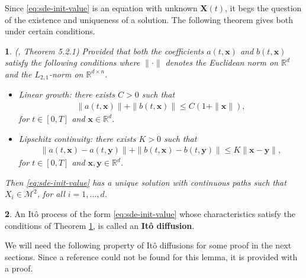 \documentclass[english]{article}
\numberwithin{equation}{section}
\numberwithin{figure}{section}
\theoremstyle{bolddescit}
\newtheorem{theorem}{\protect\theoremname}[section]
\theoremstyle{definition}
\newtheorem{definition}[theorem]{\protect\definitionname}
\theoremstyle{definition}
\theoremstyle{plain}
\theoremstyle{plain}
\theoremstyle{bolddesc}
\theoremstyle{plain}
\theoremstyle{remark}
\providecommand{\definitionname}{Definition}
\providecommand{\theoremname}{Theorem}
\begin{document}
Since \eqref{eq:sde-init-value} is an equation with unknown $\mathbf{X}(t)$, it begs the question of the existence and uniqueness of a solution. The following theorem gives both under certain conditions.

\begin{theorem}\label{thm:sde-solution}
  (\cite{oksendal_stochastic_2003}, Theorem 5.2.1)
  Provided that both the coefficients $a(t,\mathbf{x})$ and $b(t,\mathbf{x})$ satisfy the following conditions where $\|\cdot\|$ denotes the Euclidean norm on $\mathbb{R}^d$ and the $L_{2,1}$-norm on $\mathbb{R}^{d \times n}$.
  \begin{itemize}
    \item Linear growth: there exists $C > 0$ such that
      \begin{align*}
        \|a(t,\mathbf{x})\| + \|b(t,\mathbf{x})\| \le C (1 + \|\mathbf{x}\|),
      \end{align*}
      for $t \in [0,T]$ and $\mathbf{x} \in \mathbb{R}^d$.

    \item Lipschitz continuity: there exists $K > 0$ such that
      \begin{align*}
        \|a(t,\mathbf{x}) - a(t,\mathbf{y})\| + \|b(t,\mathbf{x}) - b(t,\mathbf{y})\| \le K \|\mathbf{x}-\mathbf{y}\|,
      \end{align*}
      for $t \in [0,T]$ and $\mathbf{x},\mathbf{y} \in \mathbb{R}^d$.
  \end{itemize}
  Then \eqref{eq:sde-init-value} has a unique solution with continuous paths such that $X_i \in \mathcal{M}^2$, for all $i=1,\ldots,d$.
\end{theorem}

\begin{definition}
  An It\^o process of the form \eqref{eq:sde-init-value} whose characteristics satisfy the conditions of Theorem \ref{thm:sde-solution}, is called an \textbf{It\^o diffusion}.
\end{definition}

We will need the following property of It\^o diffusions for some proof in the next sections. Since a reference could not be found for this lemma, it is provided with a proof.
\end{document}

